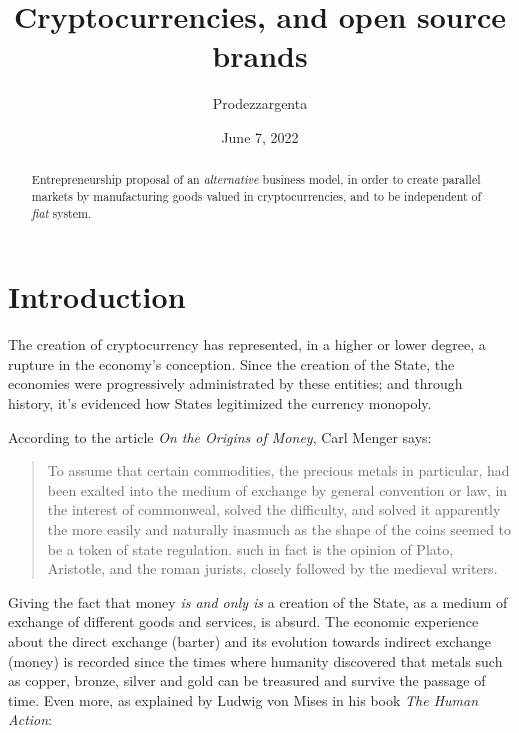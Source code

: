 \documentclass[12pt,a4paper]{article}
\author{Prodezzargenta}
\title{Cryptocurrencies, and open source brands}
\date{June 7, 2022}
\begin{document}
\maketitle

\begin{abstract}
Entrepreneurship proposal of an \textit{alternative} business model, in order to create parallel markets by manufacturing goods valued in cryptocurrencies, and to be independent of \textit{fiat} system.
\end{abstract}
	
\tableofcontents

\section{Introduction}
The creation of cryptocurrency has represented, in a higher or lower degree, a rupture in the economy's conception. Since the creation of the State, the economies were progressively administrated by these entities; and through history, it's evidenced how States legitimized the currency monopoly.

According to the article \textit{On the Origins of Money}, Carl Menger says:

\begin{quotation}
To assume that certain commodities, the precious metals in particular, had been exalted into the medium of exchange by general convention or law, in the interest of commonweal, solved the difficulty, and solved it apparently the more easily and naturally inasmuch as the shape of the coins seemed to be a token of state regulation. such in fact is the opinion of Plato, Aristotle, and the roman jurists, closely followed by the medieval writers.  \cite[p. 16]{menger:origins}
\end{quotation}

Giving the fact that money \textit{is and only is} a creation of the State, as a medium of exchange of different goods and services, is absurd. The economic experience about the direct exchange (barter) and its evolution towards indirect exchange (money) is recorded since the times where humanity discovered that metals such as copper, bronze, silver and gold can be treasured and survive the passage of time. Even more, as explained by Ludwig von Mises in his book \textit{The Human Action}:
\end{document}
